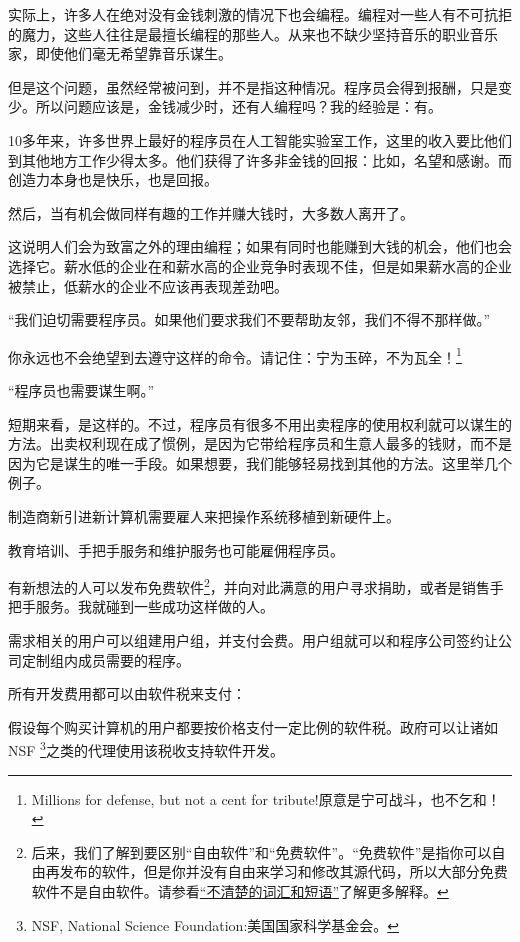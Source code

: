 实际上，许多人在绝对没有金钱刺激的情况下也会编程。编程对一些人有不可抗拒的魔力，这些人往往是最擅长编程的那些人。从来也不缺少坚持音乐的职业音乐家，即使他们毫无希望靠音乐谋生。\par
但是这个问题，虽然经常被问到，并不是指这种情况。程序员会得到报酬，只是变少。所以问题应该是，金钱减少时，还有人编程吗？我的经验是：有。\par
10多年来，许多世界上最好的程序员在人工智能实验室工作，这里的收入要比他们到其他地方工作少得太多。他们获得了许多非金钱的回报：比如，名望和感谢。而创造力本身也是快乐，也是回报。\par
然后，当有机会做同样有趣的工作并赚大钱时，大多数人离开了。\par
这说明人们会为致富之外的理由编程；如果有同时也能赚到大钱的机会，他们也会选择它。薪水低的企业在和薪水高的企业竞争时表现不佳，但是如果薪水高的企业被禁止，低薪水的企业不应该再表现差劲吧。\par
“我们迫切需要程序员。如果他们要求我们不要帮助友邻，我们不得不那样做。”\par
你永远也不会绝望到去遵守这样的命令。请记住：宁为玉碎，不为瓦全！\footnote{Millions for defense, but not a cent for tribute!原意是宁可战斗，也不乞和！}\par
“程序员也需要谋生啊。”\par
短期来看，是这样的。不过，程序员有很多不用出卖程序的使用权利就可以谋生的方法。出卖权利现在成了惯例，是因为它带给程序员和生意人最多的钱财，而不是因为它是谋生的唯一手段。如果想要，我们能够轻易找到其他的方法。这里举几个例子。\par
制造商新引进新计算机需要雇人来把操作系统移植到新硬件上。\par
教育培训、手把手服务和维护服务也可能雇佣程序员。\par
有新想法的人可以发布免费软件\footnote{后来，我们了解到要区别“自由软件”和“免费软件”。“免费软件”是指你可以自由再发布的软件，但是你并没有自由来学习和修改其源代码，所以大部分免费软件不是自由软件。请参看\href{http://www.gnu.org/philosophy/words-to-avoid.html\#GiveAwaySoftware}{“不清楚的词汇和短语”}了解更多解释。}，并向对此满意的用户寻求捐助，或者是销售手把手服务。我就碰到一些成功这样做的人。\par
需求相关的用户可以组建用户组，并支付会费。用户组就可以和程序公司签约让公司定制组内成员需要的程序。\par
所有开发费用都可以由软件税来支付：\par
假设每个购买计算机的用户都要按价格支付一定比例的软件税。政府可以让诸如NSF \footnote{NSF, National Science Foundation:美国国家科学基金会。}之类的代理使用该税收支持软件开发。\par
